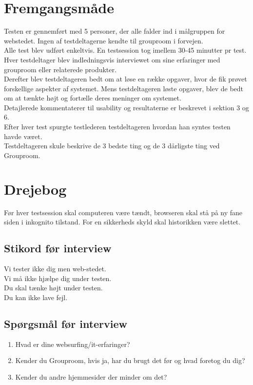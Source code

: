 \documentclass[12pt]{article}
\begin{document}
\section{Fremgangsmåde}
Testen er gennemført med 5 personer, der alle falder ind i målgruppen for webstedet. Ingen af testdeltagerne kendte til grouproom i forvejen.\\

\noindent Alle test blev udført enkeltvis. En testsession tog imellem 30-45 minutter pr test. Hver testdeltager blev indledningsvis interviewet om sine erfaringer med grouproom eller relaterede produkter. \\

\noindent Derefter blev testdeltageren bedt om at løse en række opgaver, hvor de fik prøvet forskellige aspekter af systemet. Mens testdeltageren løste opgaver, blev de bedt om at tænkte højt og fortælle deres meninger om systemet.\\
Detajlerede kommentaterer til usability og resultaterne er beskrevet i sektion 3 og 6.\\
Efter hver test spurgte testlederen testdeltageren hvordan han syntes testen havde været. \\
Testdeltageren skule beskrive de 3 bedste ting og de 3 dårligste ting ved Grouproom. \\

\section{Drejebog}
Før hver testsession skal computeren være tændt, browseren skal stå på ny fane siden i inkognito tilstand. For en sikkerheds skyld skal historikken være slettet.
\subsection{Stikord før interview}
Vi tester ikke dig men web-stedet. \\
Vi må ikke hjælpe dig under testen. \\
Du skal tænke højt under testen. \\
Du kan ikke lave fejl.
\subsection{Spørgsmål før interview}
\begin{enumerate}
  \item Hvad er dine websurfing/it-erfaringer?
  \item Kender du Grouproom, hvis ja, har du brugt det før og hvad foretog du dig?
  \item Kender du andre hjemmesider der minder om det?
\end{enumerate}
\end{document}
